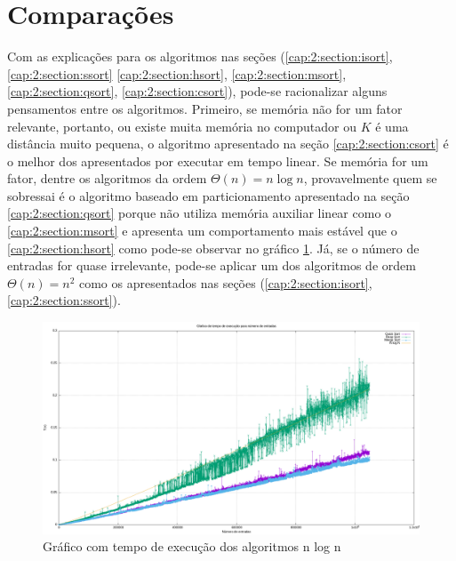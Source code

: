 






\section{Comparações}

Com as explicações para os algoritmos nas seções (\ref{cap:2:section:isort}, \ref{cap:2:section:ssort}
\ref{cap:2:section:hsort}, \ref{cap:2:section:msort}, \ref{cap:2:section:qsort}, \ref{cap:2:section:csort}),
pode-se racionalizar alguns pensamentos entre os algoritmos. Primeiro, se memória não for um fator relevante,
portanto, ou existe muita memória no computador ou $K$ é uma distância muito pequena, o algoritmo apresentado na
seção \ref{cap:2:section:csort} é o melhor dos apresentados por executar em tempo linear. Se memória for um fator,
dentre os algoritmos da ordem $\Theta(n) = n \log n$, provavelmente quem se sobressai é o algoritmo baseado em
particionamento apresentado na seção \ref{cap:2:section:qsort} porque não utiliza memória auxiliar linear como o \ref{cap:2:section:msort} e
apresenta um comportamento mais estável que o \ref{cap:2:section:hsort} como pode-se observar no gráfico \ref{cap:2:graph:combined}. 
Já, se o número de entradas for quase irrelevante, pode-se aplicar um dos algoritmos de ordem $\Theta(n) = n^2$ 
como os apresentados nas seções (\ref{cap:2:section:isort}, \ref{cap:2:section:ssort}).

\begin{figure}[h]
    \centering
    \includegraphics[width=\textwidth]{image/graphics/Combined.png}
    \caption{Gráfico com tempo de execução dos algoritmos n log n}
    \label{cap:2:graph:combined}
\end{figure}

